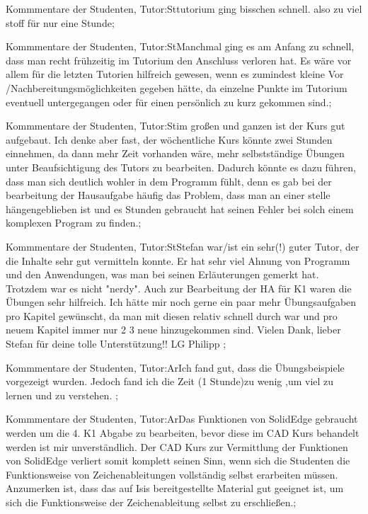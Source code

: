 \documentclass[10pt]{beamer}
\begin{document}
\begin{frame}[fragile]{Kommmentare der Studenten, Tutor:St}tutorium ging bisschen schnell. also zu viel stoff für nur eine Stunde;
 \end{frame}
\begin{frame}[fragile]{Kommmentare der Studenten, Tutor:St}Manchmal ging es am Anfang zu schnell, dass man recht frühzeitig im Tutorium den Anschluss verloren hat.  Es wäre vor allem für die letzten Tutorien hilfreich gewesen, wenn es zumindest kleine Vor /Nachbereitungsmöglichkeiten gegeben hätte, da einzelne Punkte im Tutorium eventuell untergegangen oder für einen persönlich zu kurz gekommen sind.;
 \end{frame}
\begin{frame}[fragile]{Kommmentare der Studenten, Tutor:St}im großen und ganzen ist der Kurs gut aufgebaut. Ich denke aber fast, der wöchentliche Kurs könnte zwei Stunden einnehmen, da dann mehr Zeit vorhanden wäre, mehr selbstständige Übungen unter Beaufsichtigung des Tutors zu bearbeiten. Dadurch könnte es dazu führen, dass man sich deutlich wohler in dem Programm fühlt, denn es gab bei der bearbeitung der Hausaufgabe häufig das Problem, dass man an einer stelle hängengeblieben ist und es Stunden gebraucht hat seinen Fehler bei solch einem komplexen Program zu finden.;
 \end{frame}
\begin{frame}[fragile]{Kommmentare der Studenten, Tutor:St}Stefan war/ist ein sehr(!) guter Tutor, der die Inhalte sehr gut vermitteln konnte. Er hat sehr viel Ahnung von Programm und den Anwendungen, was man bei seinen Erläuterungen gemerkt hat. Trotzdem war es nicht "nerdy". Auch zur Bearbeitung der HA für K1 waren die Übungen sehr hilfreich.  Ich hätte mir noch gerne ein paar mehr Übungsaufgaben pro Kapitel gewünscht, da man mit diesen relativ schnell durch war und pro neuem Kapitel immer nur 2 3 neue hinzugekommen sind. Vielen Dank, lieber Stefan für deine tolle Unterstützung!!  LG Philipp ;
 \end{frame}
\begin{frame}[fragile]{Kommmentare der Studenten, Tutor:Ar}Ich fand gut, dass die Übungsbeispiele vorgezeigt wurden. Jedoch fand ich die Zeit (1 Stunde)zu wenig ,um viel zu lernen und zu verstehen. ;
 \end{frame}
\begin{frame}[fragile]{Kommmentare der Studenten, Tutor:Ar}Das Funktionen von SolidEdge gebraucht werden um die 4. K1 Abgabe zu bearbeiten, bevor diese im CAD Kurs behandelt werden ist mir unverständlich.  Der CAD Kurs zur Vermittlung der Funktionen von SolidEdge verliert somit komplett seinen Sinn, wenn sich die Studenten die Funktionsweise von Zeichenableitungen vollständig selbst erarbeiten müssen.  Anzumerken ist, dass das auf Isis bereitgestellte Material gut geeignet ist, um sich die Funktionsweise der Zeichenableitung selbst zu erschließen.;
 \end{frame}
\end{document}
